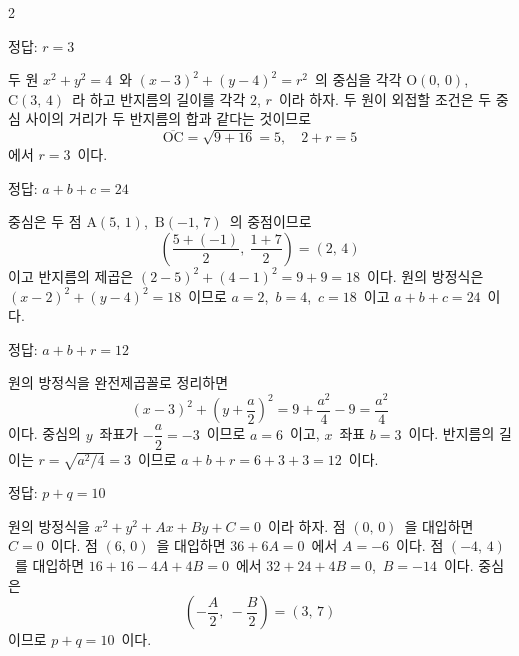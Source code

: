 \documentclass[10pt,fleqn]{article}
\begin{document}
\dmsoltitlefirsttrue
\begin{multicols*}{2}

\begin{dmanswerbox}
정답: $r=3$
\end{dmanswerbox}

두 원 $x^2 + y^2 = 4$\ 와 $(x-3)^2 + (y-4)^2 = r^2$\ 의 중심을 각각 $\mathrm{O}(0,\, 0)$, $\mathrm{C}(3,\, 4)$\ 라 하고 반지름의 길이를 각각 $2$, $r$\ 이라 하자. 두 원이 외접할 조건은 두 중심 사이의 거리가 두 반지름의 합과 같다는 것이므로
\[ \overline{\mathrm{OC}} = \sqrt{9 + 16} = 5,\quad 2 + r = 5 \]
에서 $r = 3$\ 이다.
\begin{dmanswerbox}
정답: $a+b+c=24$
\end{dmanswerbox}

중심은 두 점 $\mathrm{A}(5,\, 1)$,\ $\mathrm{B}(-1,\, 7)$\ 의 중점이므로
\[ \left( \dfrac{5+(-1)}{2},\ \dfrac{1+7}{2} \right) = (2,\, 4) \]
이고 반지름의 제곱은 $(2-5)^{2} + (4-1)^{2} = 9 + 9 = 18$\ 이다. 원의 방정식은 $(x-2)^2 + (y-4)^2 = 18$\ 이므로 $a = 2$,\ $b = 4$,\ $c = 18$\ 이고 $a + b + c = 24$\ 이다.

\begin{dmanswerbox}
정답: $a+b+r=12$
\end{dmanswerbox}

원의 방정식을 완전제곱꼴로 정리하면
\[ (x-3)^2 + \left( y + \dfrac{a}{2} \right)^2 = 9 + \dfrac{a^2}{4} - 9 = \dfrac{a^2}{4} \]
이다. 중심의 $y$\ 좌표가 $-\dfrac{a}{2} = -3$\ 이므로 $a = 6$\ 이고, $x$\ 좌표 $b = 3$\ 이다. 반지름의 길이는 $r = \sqrt{a^2/4} = 3$\ 이므로 $a + b + r = 6 + 3 + 3 = 12$\ 이다.

\begin{dmanswerbox}
정답: $p+q=10$
\end{dmanswerbox}

원의 방정식을 $x^2 + y^2 + Ax + By + C = 0$\ 이라 하자. 점 $(0,\, 0)$\ 을 대입하면 $C = 0$\ 이다. 점 $(6,\, 0)$\ 을 대입하면 $36 + 6A = 0$\ 에서 $A = -6$\ 이다. 점 $(-4,\, 4)$\ 를 대입하면 $16 + 16 - 4A + 4B = 0$\ 에서 $32 + 24 + 4B = 0$,\ $B = -14$\ 이다. 중심은
\[ \left( -\dfrac{A}{2},\ -\dfrac{B}{2} \right) = (3,\, 7) \]
이므로 $p + q = 10$\ 이다.


\end{multicols*}
\end{document}
